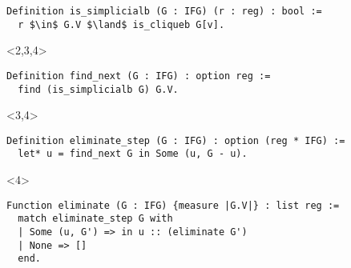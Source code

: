 
\begin{overlayarea}{\textwidth}{8cm}
\begin{onlyenv}
\begin{lstlisting}[style=Rocq]
Definition is_simplicialb (G : IFG) (r : reg) : bool :=
  r $\in$ G.V $\land$ is_cliqueb G[v].
\end{lstlisting}
\end{onlyenv}

\begin{onlyenv}<2,3,4>
\begin{lstlisting}[style=Rocq]
Definition find_next (G : IFG) : option reg :=
  find (is_simplicialb G) G.V.
\end{lstlisting}
\end{onlyenv}

\begin{onlyenv}<3,4>
\begin{lstlisting}[style=Rocq]
Definition eliminate_step (G : IFG) : option (reg * IFG) :=
  let* u = find_next G in Some (u, G - u).
\end{lstlisting}
\end{onlyenv}

\begin{onlyenv}<4>
\begin{lstlisting}[style=Rocq]
Function eliminate (G : IFG) {measure |G.V|} : list reg :=
  match eliminate_step G with
  | Some (u, G') => in u :: (eliminate G')
  | None => []
  end.
\end{lstlisting}
\end{onlyenv}
\end{overlayarea}